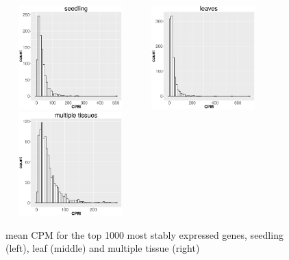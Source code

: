\documentclass[11pt, a4paper]{article}
\begin{document}
\begin{figure}[] \begin{center}
    \includegraphics[width=5cm,height=4cm]{Figures/cpm_seedling.eps}
    \includegraphics[width=5cm,height=4cm]{Figures/cpm_leaves.eps}
    \includegraphics[width=5cm,height=4cm]{Figures/cpm_tissue.eps}
    \caption{{\small{\label{cpm} mean CPM for the top 1000 most stably
    expressed genes, seedling (left), leaf (middle) and multiple tissue
    (right) }}} \end{center} 
\end{figure} 

\end{document}
